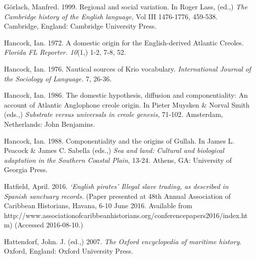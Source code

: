 \begin{styleStandard}
Görlach, Manfred. 1999.\textit{ }Regional and social variation.\textit{ }In Roger Lass, (ed.,)\textit{ The Cambridge} \textit{history of the English language, }Vol III\textit{ }1476-1776\textit{, }459-538.\textit{ }Cambridge, England: Cambridge University Press.
\end{styleStandard}

\begin{styleStandard}
Hancock, Ian. 1972. A domestic origin for the English-derived Atlantic Creoles. \textit{Florida FL Reporter. 10}(1,) 1-2, 7-8, 52.
\end{styleStandard}

\begin{styleStandard}
Hancock, Ian. 1976. Nautical sources of Krio vocabulary. \textit{International Journal of the} \textit{Sociology of Language. }7, 26-36.
\end{styleStandard}

\begin{styleStandard}
Hancock, Ian. 1986. The domestic hypothesis, diffusion and componentiality: An account of Atlantic Anglophone creole origin. In Pieter Muysken \& Norval Smith (eds.,) \textit{Substrate versus universals in creole genesis}, 71-102\textit{. }Amsterdam, Netherlands: John Benjamins.
\end{styleStandard}

\begin{styleStandard}
Hancock, Ian. 1988. Componentiality and the origins of Gullah. In James L. Peacock \& James C. Sabella (eds.,) \textit{Sea and land: Cultural and biological adaptation in the Southern Coastal Plain}, 13-24\textit{. }Athens, GA: University of Georgia Press.
\end{styleStandard}

\begin{styleStandard}
Hatfield, April. 2016. \textit{‘English pirates’ Illegal slave trading, as described in Spanish sanctuary records. }(Paper presented at 48th Annual Association of Caribbean Historians, Havana, 6-10 June 2016. Available from http://www.associationofcaribbeanhistorians.org/conferencepapers2016/index.htm) (Accessed 2016-08-10.)
\end{styleStandard}

\begin{styleStandard}
Hattendorf, John. J. (ed.,) 2007. \textit{The Oxford encyclopedia of maritime history}. Oxford, England: Oxford University Press. 
\end{styleStandard}

